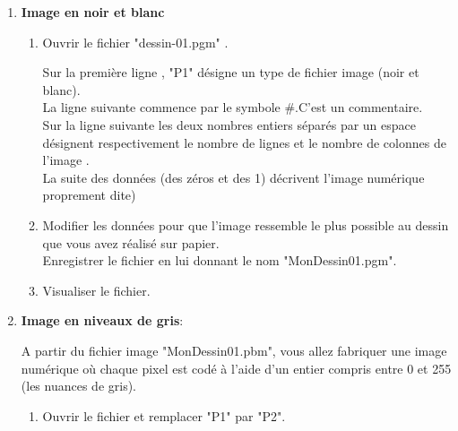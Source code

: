 \documentclass[10pt,fleqn]{article} %
\begin{document}
	
	\begin{enumerate}	
		
	\item \textbf{Image en noir et blanc}
	
	\medskip
	
	
		\begin{enumerate}
			
			
			\item Ouvrir le fichier "dessin-01.pgm" .
			
			
			
			Sur la première ligne , "P1" désigne un type de fichier image (noir et blanc).\\
			
			La ligne suivante commence par le symbole $\#$.C'est un commentaire.\\
			
			Sur la ligne suivante les deux nombres entiers séparés par un espace désignent respectivement le nombre de lignes et le nombre de colonnes de l'image .\\
			
						
			La suite des données (des zéros et des 1) décrivent l'image numérique proprement dite)
			
			\item Modifier les données pour que l'image ressemble le plus possible au dessin que vous avez réalisé sur papier.\\
			
			Enregistrer le fichier en lui donnant le nom "MonDessin01.pgm".
			
			\medskip
			
			
			\item Visualiser le fichier.
			
			
		\end{enumerate}
		
	\medskip
	\item  \textbf{Image en niveaux de gris}:
	
 \medskip
 
		
		A partir du fichier image "MonDessin01.pbm", vous allez fabriquer une image numérique où chaque pixel est codé à l'aide d'un entier compris entre 0 et 255 (les nuances de gris).
		\begin{enumerate}
			\item Ouvrir le fichier et remplacer "P1" par "P2".\\
			

\end{enumerate}
\end{enumerate}
\end{document}
